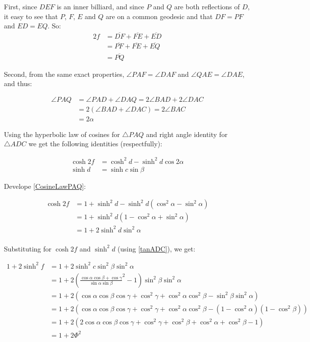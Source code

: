 \documentclass[a4paper,10pt]{article}
\begin{document}
First, since $DEF$ is an inner billiard, and since $P$ and $Q$ are
both reflections of $D$, it easy to see that $P$, $F$, $E$ and $Q$ are
on a common geodesic and that $DF = PF$ and $ED=EQ$. So:
\begin{align*}
2f &= \overline{DF} + \overline{FE} + \overline{ED}\\
     &= \overline{PF} + \overline{FE} + \overline{EQ}\\
     &= \overline{PQ}
\end{align*}

Second, from the same exact properties, $\angle PAF = \angle DAF$ and
$\angle QAE = \angle DAE$, and thus:

\begin{align*}
\angle PAQ &= \angle PAD + \angle DAQ = 2\angle BAD + 2\angle DAC \\
           &= 2\left(\angle BAD + \angle DAC \right) = 2\angle BAC \\
           &= 2\alpha
\end{align*}

Using the hyperbolic law of cosines for $\triangle PAQ$ and right
angle identity for $\triangle ADC$ we get the following identities
(respectfully):

\begin{align}
\cosh{2f} &= \cosh^2{d} - \sinh^2{d}\cos{2\alpha} \label{CosineLawPAQ} \\
\sinh{d} &= \sinh{c}\sin{\beta} \label{tanADC}
\end{align}

Develope \eqref{CosineLawPAQ}:

\begin{align*}
\cosh{2f} &=1+ \sinh^2{d} - \sinh^2{d}\left(\cos^2{\alpha} - \sin^2{\alpha}\right) \\
&=1+ \sinh^2{d}\left(1 - \cos^2{\alpha} + \sin^2{\alpha}\right) \\
&=1+2\sinh^2{d}\sin^2{\alpha} \\
\end{align*}

Substituting for $\cosh{2f}$ and $\sinh^2{d}$ (using \eqref{tanADC}), we get:

\begin{align*}
1 + 2\sinh^2{f} &=1+2\sinh^2{c}\sin^2{\beta}\sin^2{\alpha} \\
&=1+2\left(\frac{\cos{\alpha}\cos{\beta} + \cos{\gamma}}{\sin{\alpha}\sin{\beta}}^2 - 1\right)\sin^2{\beta}\sin^2{\alpha} \\
&=1+2\left(\cos{\alpha}\cos{\beta}\cos{\gamma} + \cos^2{\gamma} + \cos^2{\alpha}\cos^2{\beta} - \sin^2{\beta}\sin^2{\alpha} \right) \\
&=1+2\left(\cos{\alpha}\cos{\beta}\cos{\gamma} + \cos^2{\gamma} + \cos^2{\alpha}\cos^2{\beta} -
\left(1-\cos^2{\alpha}\right)\left(1-\cos^2{\beta}\right)\right)\\
&=1+2\left(2\cos{\alpha}\cos{\beta}\cos{\gamma} + \cos^2{\gamma} + \cos^2{\beta} + \cos^2{\alpha} + \cos^2{\beta} - 1\right) \\
&=1+2\Phi^2 \\
\end{align*}
\end{document}
